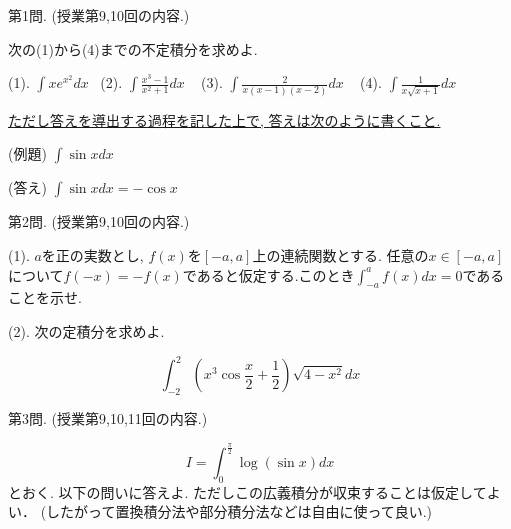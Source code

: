 \documentclass[dvipdfmx,a4paper,11pt]{article}
\newcommand{\Tan}{\text{Tan}^{-1}}
\theoremstyle{definition}
\begin{document}
{\Large 第1問.} (授業第9,10回の内容.)
\vspace{11pt}

次の(1)から(4)までの不定積分を求めよ.


\vspace{11pt}

(1). $\int x e^{x^2} dx$\,\,\,
(2). $\int \frac{x^3 -1}{x^2 +1} dx$ \,\,\,
(3). $\int \frac{2}{x(x-1)(x-2)} dx$ \,\,\,
(4). $\int  \frac{1}{x \sqrt{x+1}} dx$

\vspace{11pt}

\underline{ただし答えを導出する過程を記した上で, 答えは次のように書くこと.}

\vspace{11pt}

(例題) $ \int \sin x dx$ 

(答え) $\int \sin x dx = - \cos x$




 \vspace{33pt}
 
 {\Large 第2問.} (授業第9,10回の内容.)
 \vspace{11pt}
 
 

(1). $a$を正の実数とし, $f(x)$を$[-a,a]$上の連続関数とする. 任意の$x \in [-a, a]$について$f(-x) = - f(x)$であると仮定する.このとき$\int_{-a}^{a} f(x) dx =0$であることを示せ.

    \vspace{11pt}
    
(2). 次の定積分を求めよ.

$$
\int_{-2}^{2} \left( x^3 \cos \frac{x}{2} + \frac{1}{2} \right) \sqrt{4 - x^2} dx
$$

   \vspace{33pt}
   
   {\Large 第3問.} (授業第9,10,11回の内容.)
    \vspace{11pt}
 
$$
I = \int_{0}^{\frac{\pi}{2}} \log (\sin x) dx
$$
とおく.
以下の問いに答えよ.
ただしこの広義積分が収束することは仮定してよい．
(したがって置換積分法や部分積分法などは自由に使って良い.)
     
\end{document}
